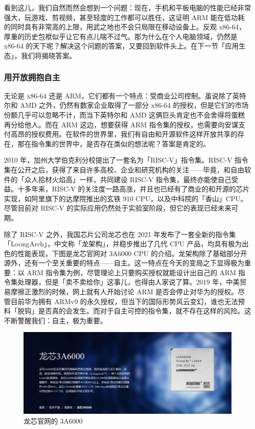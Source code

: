 看到这儿，我们自然而然会想到一个问题：现在，手机和平板电脑的性能已经非常强大，玩游戏、剪视频，甚至轻度的工作都可以胜任，这证明 ARM 能在低功耗的同时具有非常高的上限，用武之地也不会只局限在移动设备上。反观 x86-64，厚重的历史包袱似乎让它有点儿喘不过气。那为什么在个人电脑领域，仍然是 x86-64 的天下呢？解决这个问题的答案，又要回到软件头上。在下一节「应用生态」，我们将揭晓答案。

\subsubsection{用开放拥抱自主}

无论是 x86-64 还是 ARM，它们都有一个特点：受商业公司控制。虽说除了英特尔和 AMD 之外，仍然有数家企业取得了一部分 x86-64 的授权，但是它们的市场份额几乎可以忽略不计，而当下英特尔和 AMD 这俩巨头肯定也不会舍得将蛋糕再分给他人。而在 ARM 这边，想要获得 ARM 指令集的授权，也需要向安谋支付高昂的授权费用。在软件的世界里，我们有自由和开源软件这样开放共享的存在，那在指令集的世界中，是否存在类似的想法呢？答案是肯定的。

2010 年，加州大学伯克利分校提出了一套名为「RISC-V」指令集。RISC-V 指令集在公开之后，获得了来自许多高校、企业和研究机构的关注——毕竟，和自由软件的「众人拾材火焰高」一样，共同建设 RISC-V 指令集，最终亦能使自己受益。十多年来，RISC-V 的关注度一路高涨，并且也已经有了商业的和开源的芯片实现，如阿里旗下的达摩院推出的玄铁 910 CPU，以及中科院的「香山」CPU。尽管目前对 RISC-V 的实际应用仍然处于实验室阶段，但它的表现已经未来可期。

除了 RISC-V 之外，我国芯片公司龙芯也在 2021 年发布了一套全新的指令集「LoongArch」，中文称「龙架构」，并稳步推出了几代 CPU 产品，均具有极为出色的性能表现，下图是龙芯官网对 3A6000 CPU 的介绍。龙架构除了基础部分开源外，还有一个至关重要的特点——自主。这一特点在今天的变局之下显得极为重要：以 ARM 指令集为例，尽管理论上只要购买授权就能设计出自己的 ARM 指令集处理器，但是「卖不卖给你」这事儿，也得由人家说了算。2019 年，中美贸易摩擦正激烈的时候，网上就有人开始讨论 ARM 是否会停止对华为的授权。尽管目前华为拥有 ARMv9 的永久授权，但当下的国际形势风云变幻，谁也无法预料「脱钩」是否真的会发生。而对于自主可控的指令集，就不存在这样的风险。这不断警醒我们：自主，极为重要。

\begin{figure}[htb!]
  \centering
  \includegraphics[width=.75\textwidth]{assets/surpass/LS3A6K_webpage.png}
  \caption{龙芯官网的 3A6000}
  \label{fig:LS3A6K_webpage}
\end{figure}

